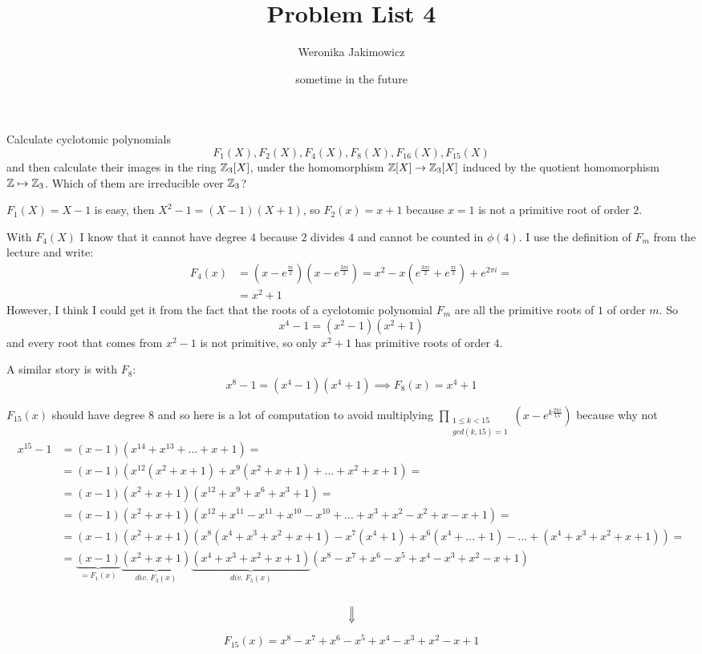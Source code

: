 \documentclass{article}
\title{Problem List 4}
\author{Weronika Jakimowicz}
\date{\scriptsize sometime in the future}
\begin{document}
\maketitle\thispagestyle{empty}

\begin{problem}[1]{}
Calculate cyclotomic polynomials
$$F_1(X),F_2(X),F_4(X),F_8(X),F_{16}(X),F_{15}(X)$$
and then calculate their images in the ring $\mathbb{Z}_3[X]$, under the homomorphism $\mathbb{Z}[X]\to\mathbb{Z}_3[X]$ induced by the quotient homomorphism $\mathbb{Z}\mapsto\mathbb{Z}_3$. Which of them are irreducible over $\mathbb{Z}_3$?
\end{problem}

$F_1(X)=X-1$ is easy, then $X^2-1=(X-1)(X+1)$, so $F_2(x)=x+1$ because $x=1$ is not a primitive root of order $2$. 

With $F_4(X)$ I know that it cannot have degree $4$ because $2$ divides $4$ and cannot be counted in $\phi(4)$. I use the definition of $F_m$ from the lecture and write:
\begin{align*}
    F_4(x)&=(x-e^{\frac{\pi i}{2}})(x-e^{\frac{3\pi i}{2}})=x^2-x(e^{\frac{3\pi i}{2}}+e^{\frac{\pi i}{2}})+e^{2\pi i}=\\
    &=x^2+1
\end{align*}
However, I think I could get it from the fact that the roots of a cyclotomic polynomial $F_m$ are all the primitive roots of $1$ of order $m$. So
$$x^4-1=(x^2-1)(x^2+1)$$
and every root that comes from $x^2-1$ is not primitive, so only $x^2+1$ has primitive roots of order $4$.

A similar story is with $F_8:$
$$x^8-1=(x^4-1)(x^4+1)\implies F_8(x)=x^4+1$$

$F_{15}(x)$ should have degree $8$ and so here is a lot of computation to avoid multiplying $\prod\limits_{\substack{1\leq k<15\\gcd(k,15)=1}}(x-e^{k\frac{2\pi i}{15}})$ because why not
\begin{align*}
    x^{15}-1&=(x-1)(x^{14}+x^{13}+...+x+1)=\\
    &=(x-1)(x^{12}(x^2+x+1)+x^{9}(x^2+x+1)+...+x^2+x+1)=\\
    &=(x-1)(x^2+x+1)(x^{12}+x^9+x^6+x^3+1)=\\
    &=(x-1)(x^2+x+1)(x^{12}+x^{11}-x^{11}+x^{10}-x^{10}+...+x^3+x^2-x^2+x-x+1)=\\
    &=(x-1)(x^2+x+1)(x^8(x^4+x^3+x^2+x+1)-x^7(x^4+1)+x^6(x^4+...+1)-...+(x^4+x^3+x^2+x+1))=\\
    &=\underbrace{(x-1)}_{=F_1(x)}\underbrace{(x^2+x+1)}_{div.\;F_3(x)}\underbrace{(x^4+x^3+x^2+x+1)}_{div.\;F_5(x)}(x^8-x^7+x^6-x^5+x^4-x^3+x^2-x+1)
\end{align*}
$$\rotatebox{-90}{$\implies$}$$
$$F_{15}(x)=x^8-x^7+x^6-x^5+x^4-x^3+x^2-x+1$$
\end{document}
